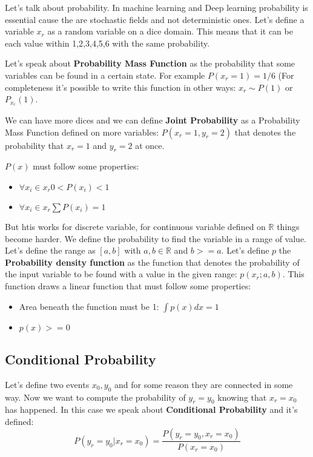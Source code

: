 Let's talk about probability. In machine learning and Deep learning probability is essential cause the are stochastic fields and not deterministic ones. Let's define a variable $x_r$ as a random variable on a dice domain. This means that it can be each value within 1,2,3,4,5,6 with the same probability. 

Let's speak about \textbf{Probability Mass Function} as the probability that some variables can be found in a certain state.
For example $P(x_r = 1) = 1/6$ (For completeness it's possible to write this function in other ways: $x_r \sim P(1)$ or $P_{x_r}(1) $. 

We can have more dices and we can define  \textbf{Joint Probability} as a Probability Mass Function defined on more variables: $P(x_r = 1, y_r = 2)$ that denotes the probability that $x_r = 1$ and $y_r = 2$ at once.

$P(x)$ must follow some properties:
\begin{itemize}
 \item $\forall x_i \in x_r 0 < P(x_i) < 1$
 \item $\forall x_i \in x_r \sum P(x_i) = 1  $
 \end{itemize} 
 
 But htis works for discrete variable, for continuous variable defined on $\mathbb{R}$ things become harder. We define the probability to find the variable in a range of value. Let's define the range as $[a,b]$ with $a,b \in \mathbb{R}$ and $b>=a$. Let's define $p$ the \textbf{Probability density function} as the function that denotes the probability of the input variable to be found with a value in the given range: $p(x_r; a, b)$. This function draws a linear function that must follow some properties:
 \begin{itemize}
  \item Area beneath the function must be 1: $\int p(x)dx = 1$
  \item $p(x) >= 0$ 
  \end{itemize} 
  
  \subsection{Conditional Probability}
  
  Let's define two events $x_0, y_0$ and for some reason they are connected in some way. Now we want to compute the probability of $y_r = y_0$ knowing that  $x_r = x_0$ has happened. In this case we speak about \textbf{Conditional Probability} and it's defined: 
  \begin{equation}
    P( y_r = y_0|x_r = x_0) = \frac{P( y_r = y_0, x_r = x_0)}{P(x_r = x_0)}
  \end{equation}
  

